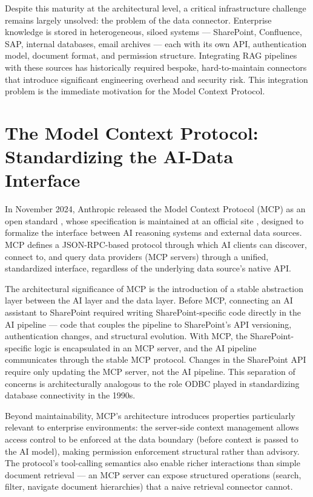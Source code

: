 Despite this maturity at the architectural level, a critical infrastructure challenge remains largely unsolved: the problem of the data connector. Enterprise knowledge is stored in heterogeneous, siloed systems — SharePoint, Confluence, SAP, internal databases, email archives — each with its own API, authentication model, document format, and permission structure. Integrating RAG pipelines with these sources has historically required bespoke, hard-to-maintain connectors that introduce significant engineering overhead and security risk. This integration problem is the immediate motivation for the Model Context Protocol.

\section{The Model Context Protocol: Standardizing the AI-Data Interface}
\label{sec:intro-mcp}

In November 2024, Anthropic released the Model Context Protocol (MCP) as an open standard \citep{Anthropic2024MCP}, whose specification is maintained at an official site \citep{MCPSpec2025}, designed to formalize the interface between AI reasoning systems and external data sources. MCP defines a JSON-RPC-based protocol through which AI clients can discover, connect to, and query data providers (MCP servers) through a unified, standardized interface, regardless of the underlying data source's native API.

The architectural significance of MCP is the introduction of a stable abstraction layer between the AI layer and the data layer. Before MCP, connecting an AI assistant to SharePoint required writing SharePoint-specific code directly in the AI pipeline — code that couples the pipeline to SharePoint's API versioning, authentication changes, and structural evolution. With MCP, the SharePoint-specific logic is encapsulated in an MCP server, and the AI pipeline communicates through the stable MCP protocol. Changes in the SharePoint API require only updating the MCP server, not the AI pipeline. This separation of concerns is architecturally analogous to the role ODBC played in standardizing database connectivity in the 1990s.

Beyond maintainability, MCP's architecture introduces properties particularly relevant to enterprise environments: the server-side context management allows access control to be enforced at the data boundary (before context is passed to the AI model), making permission enforcement structural rather than advisory. The protocol's tool-calling semantics also enable richer interactions than simple document retrieval — an MCP server can expose structured operations (search, filter, navigate document hierarchies) that a naive retrieval connector cannot.

